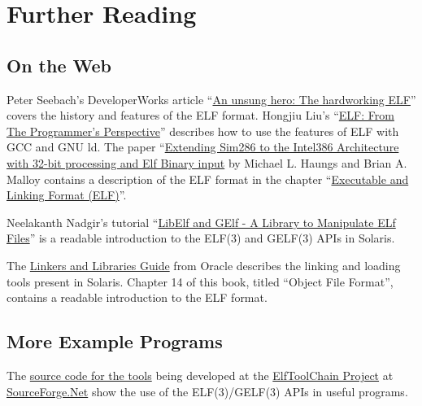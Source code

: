 \documentclass[a4paper,pdftex]{book}
\newcommand{\elftoolchainproject}{\href{https://elftoolchain.sourceforge.io/}%
    {ElfToolChain Project}\xspace}%
\newcommand{\reg}{\raisebox{0.7ex}{\small\textregistered}\xspace}
\newcommand{\trade}{{\small\texttrademark}\xspace}
\begin{document}
\section{Further Reading}


\subsection{On the Web}
Peter Seebach's DeveloperWorks article ``\href{%
https://web.archive.org/web/20070224140341/http://www-128.ibm.com/developerworks/power/library/pa-spec12/%
}{An unsung hero: The hardworking ELF}'' covers the history and
features of the ELF format. Hongjiu Liu's ``\href{%
https://citeseerx.ist.psu.edu/viewdoc/summary?doi=10.1.1.37.8698}{ELF:
From The Programmer's Perspective}'' describes how to use the
features of ELF with GCC and GNU ld.  The paper ``\href{%
http://citeseerx.ist.psu.edu/viewdoc/summary?doi=10.1.1.136.2517}{Extending
Sim286 to the Intel386 Architecture with 32-bit processing and Elf
Binary input} by Michael L. Haungs and Brian A. Malloy contains a
description of the ELF format in the chapter ``\href{%
https://web.archive.org/web/20071217235525/www.cs.ucdavis.edu/~haungs/paper/node10.html%
}{Executable and Linking Format (ELF)}''.

Neelakanth Nadgir's tutorial ``\href{%
https://web.archive.org/web/20110926220119/http://developers.sun.com/solaris/articles/elf.html%
}{LibElf and GElf - A Library to Manipulate ELf Files}'' is a readable
introduction to the ELF(3) and GELF(3) APIs in Solaris\trade.

The
\href{https://docs.oracle.com/cd/E53394_01/html/E54813/index.html}{Linkers
and Libraries Guide} from Oracle\reg describes the linking and
loading tools present in Solaris\trade.  Chapter 14 of this book,
titled ``Object File Format'', contains a readable introduction to the
ELF format.

\subsection{More Example Programs}

The
\href{https://sourceforge.net/p/elftoolchain/code/HEAD/tree/trunk/}%
{source code for the tools} being developed at the
\elftoolchainproject at \href{https://sourceforge.net/}{SourceForge.Net}
show the use of the ELF(3)/GELF(3) APIs in useful programs.
\end{document}
